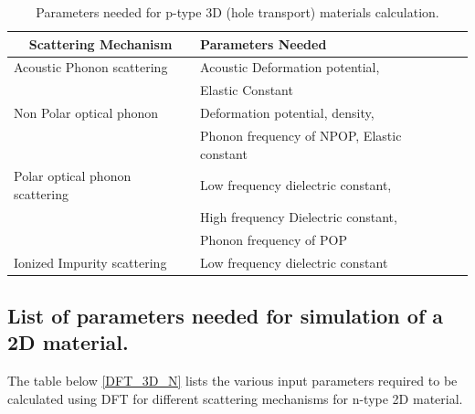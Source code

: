 \documentclass[12pt]{article}
\begin{document}
\begin{table} [H]
\centering
\caption{Parameters needed for p-type 3D (hole transport) materials calculation.}
\label{DFT_3D_P}
\begin{tabular}{|l|l|l|}
\hline
\multicolumn{1}{|c|}{\textbf{Scattering Mechanism}} & {\textbf{Parameters Needed}} \\
\hline                                      
Acoustic Phonon scattering   & Acoustic Deformation potential, \\
 &  Elastic Constant \\
\hline   
Non Polar optical phonon  & Deformation potential, density, \\
 & Phonon frequency of NPOP, Elastic constant \\
\hline  
Polar optical phonon
scattering & Low frequency dielectric constant, \\
 & High frequency Dielectric constant, \\ 
 & Phonon frequency of POP \\
\hline
Ionized Impurity scattering & Low frequency dielectric constant \\
\hline

\end{tabular}
\end{table}



\subsection{List of parameters needed for simulation of a 2D material.}  
The table below \ref{DFT_3D_N} lists the various input parameters required to be calculated using DFT for different scattering mechanisms for n-type 2D material.
\end{document}

